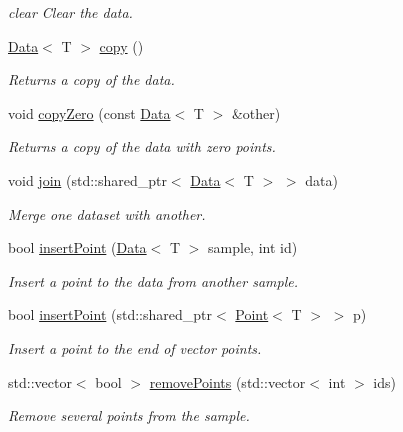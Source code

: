 \begin{DoxyCompactItemize}
\begin{DoxyCompactList}\small\item\em clear Clear the data. \end{DoxyCompactList}\item 
\hyperlink{class_data}{Data}$<$ T $>$ \hyperlink{class_data_ae1cc8dec46ae498a0d00f4e573edc795}{copy} ()
\begin{DoxyCompactList}\small\item\em Returns a copy of the data. \end{DoxyCompactList}\item 
void \hyperlink{class_data_ad94f8c8227a298b5cc0a862658f8cb99}{copy\+Zero} (const \hyperlink{class_data}{Data}$<$ T $>$ \&other)
\begin{DoxyCompactList}\small\item\em Returns a copy of the data with zero points. \end{DoxyCompactList}\item 
void \hyperlink{class_data_abf57674d356299c2be916331791e8f12}{join} (std\+::shared\+\_\+ptr$<$ \hyperlink{class_data}{Data}$<$ T $>$ $>$ data)
\begin{DoxyCompactList}\small\item\em Merge one dataset with another. \end{DoxyCompactList}\item 
bool \hyperlink{class_data_a2357782011d11c06500b1d752b9428c6}{insert\+Point} (\hyperlink{class_data}{Data}$<$ T $>$ sample, int id)
\begin{DoxyCompactList}\small\item\em Insert a point to the data from another sample. \end{DoxyCompactList}\item 
bool \hyperlink{class_data_a709cae94a533608e61a5e1e5039b0b35}{insert\+Point} (std\+::shared\+\_\+ptr$<$ \hyperlink{class_point}{Point}$<$ T $>$ $>$ p)
\begin{DoxyCompactList}\small\item\em Insert a point to the end of vector points. \end{DoxyCompactList}\item 
std\+::vector$<$ bool $>$ \hyperlink{class_data_ae5a3ca86bedc35bef909aac993439827}{remove\+Points} (std\+::vector$<$ int $>$ ids)
\begin{DoxyCompactList}\small\item\em Remove several points from the sample. \end{DoxyCompactList}\item 

\end{DoxyCompactItemize}
